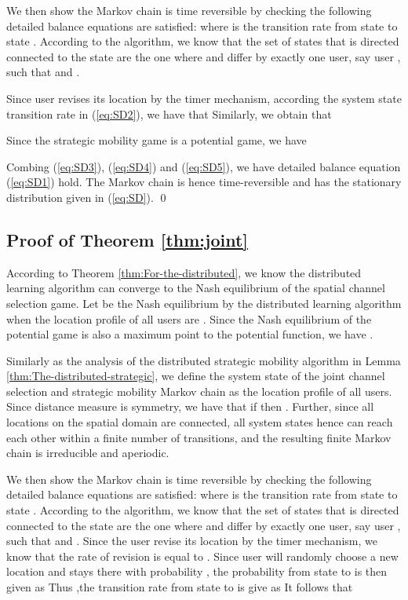 We then show the Markov chain is time reversible by checking the following
detailed balance equations are satisfied:
where  is the transition rate from state 
to state . According to the algorithm,
we know that the set of states that is directed connected to the state
 are the one where  and  differ by exactly one user,
say user , such that  and .

Since user  revises its location by the timer mechanism, according the system state transition rate in (\ref{eq:SD2}), we have that
Similarly, we obtain that

Since the strategic mobility game is a potential game, we have

Combing (\ref{eq:SD3}), (\ref{eq:SD4}) and (\ref{eq:SD5}), we have
detailed balance equation (\ref{eq:SD1}) hold. The Markov chain
is hence time-reversible and has the stationary distribution given
in (\ref{eq:SD}). \qed

\subsection{Proof of Theorem \ref{thm:joint}}\label{proof4}
According to Theorem \ref{thm:For-the-distributed}, we know the distributed
learning algorithm can converge to the Nash equilibrium of the spatial channel
selection game. Let  be the Nash equilibrium by the distributed
learning algorithm when the location profile of all users are .
Since the Nash equilibrium of the potential game is also a maximum
point to the potential function, we have .




Similarly as the analysis of the distributed strategic
mobility algorithm in Lemma \ref{thm:The-distributed-strategic},
we define the system state of the joint channel selection and strategic mobility Markov chain as the location profile
 of all users. Since distance measure is symmetry, we
have that if  then .
Further, since all locations on the spatial domain  are connected,
all system states  hence can reach each other within a finite
number of transitions, and the resulting finite Markov chain is irreducible
and aperiodic.

We then show the Markov chain is time reversible by checking the following
detailed balance equations are satisfied:
where  is the transition rate from state 
to state . According to the algorithm,
we know that the set of states that is directed connected to the state
 are the one where  and  differ by exactly one user,
say user , such that  and .
Since the user  revise its location by the timer mechanism, we
know that the rate of revision is equal to .
Since user  will randomly choose a new location  and
stays there with probability ,
the probability from state  to  is then given as 
Thus ,the transition rate from state  to is give as 
It follows that

